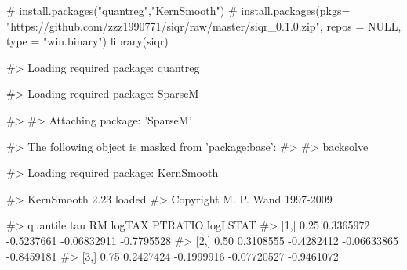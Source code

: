 \begin{Schunk}
\begin{Sinput}
# install.packages("quantreg","KernSmooth")
# install.packages(pkgs= "https://github.com/zzz1990771/siqr/raw/master/siqr_0.1.0.zip", repos = NULL, type = "win.binary")
library(siqr)
\end{Sinput}
\begin{Soutput}
#> Loading required package: quantreg
\end{Soutput}
\begin{Soutput}
#> Loading required package: SparseM
\end{Soutput}
\begin{Soutput}
#> 
#> Attaching package: 'SparseM'
\end{Soutput}
\begin{Soutput}
#> The following object is masked from 'package:base':
#> 
#>     backsolve
\end{Soutput}
\begin{Soutput}
#> Loading required package: KernSmooth
\end{Soutput}
\begin{Soutput}
#> KernSmooth 2.23 loaded
#> Copyright M. P. Wand 1997-2009
\end{Soutput}
\begin{Soutput}
#>      quantile tau        RM     logTAX     PTRATIO   logLSTAT
#> [1,]         0.25 0.3365972 -0.5237661 -0.06832911 -0.7795528
#> [2,]         0.50 0.3108555 -0.4282412 -0.06633865 -0.8459181
#> [3,]         0.75 0.2427424 -0.1999916 -0.07720527 -0.9461072
\end{Soutput}
\end{Schunk}

